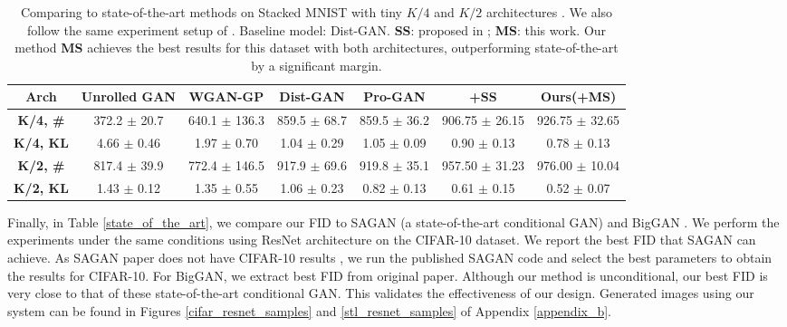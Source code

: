 \documentclass{article}
\begin{document}
\begin{table}
    \centering
    \scriptsize
    \caption{Comparing to state-of-the-art methods on Stacked MNIST with tiny $K/4$ and $K/2$ architectures \cite{metz-arxiv-2016}. We also follow the same experiment setup of \cite{metz-arxiv-2016}. Baseline model: Dist-GAN. {\bf SS}: proposed in \cite{chen-arxiv-2018}; {\bf MS}: this work. Our method {\bf MS} achieves the best results for this dataset with both architectures, outperforming state-of-the-art \cite{tran-eccv-2018,karras-iclr-2018} by a significant margin.}
    \begin{tabular}{ c  c  c  c  c  c  c }
    \toprule
    \textbf{Arch} & \textbf{Unrolled GAN \cite{metz-arxiv-2016}} & \textbf{WGAN-GP \cite{gulrajani-arxiv-2017}} & \textbf{Dist-GAN \cite{tran-eccv-2018}} & \textbf{Pro-GAN \cite{karras-iclr-2018}} & \textbf{\cite{tran-eccv-2018}+SS} & \textbf{Ours(\cite{tran-eccv-2018}+MS)}\\ 
    \hline
    \textbf{K/4, \#} & 372.2 $\pm$ 20.7 & 640.1 $\pm$ 136.3 & 859.5 $\pm$ 68.7 & 859.5 $\pm$ 36.2 & 906.75 $\pm$ 26.15 & 926.75 $\pm$ 32.65 \\ 
    \textbf{K/4, KL} & 4.66 $\pm$ 0.46 & 1.97 $\pm$ 0.70 & 1.04 $\pm$ 0.29 & 1.05 $\pm$ 0.09 & 0.90 $\pm$ 0.13 & 0.78 $\pm$ 0.13\\
    \hline
    \textbf{K/2, \#} & 817.4 $\pm$ 39.9 & 772.4 $\pm$ 146.5 & 917.9 $\pm$ 69.6 & 919.8 $\pm$ 35.1 & 957.50 $\pm$ 31.23 & 976.00 $\pm$ 10.04\\ 
    \textbf{K/2, KL} & 1.43 $\pm$ 0.12 & 1.35 $\pm$ 0.55  & 1.06 $\pm$ 0.23 & 0.82 $\pm$ 0.13 & 0.61 $\pm$ 0.15 & 0.52 $\pm$ 0.07\\
    \bottomrule
    \end{tabular}
    \label{new_experiments_stacked_mnist}
    \vspace{-0.4cm}
\end{table}

Finally, in Table \ref{state_of_the_art}, we compare our FID to SAGAN \cite{zhang-arxiv-2018} (a state-of-the-art conditional GAN) and BigGAN \cite{brock-iclr-2018}. We perform the experiments under the same conditions using ResNet architecture on the  CIFAR-10 dataset. We report the best FID that SAGAN can achieve. As SAGAN paper does not have CIFAR-10 results \cite{zhang-arxiv-2018}, we run the published SAGAN code and select the best parameters to obtain the results for CIFAR-10. For BigGAN, we extract best FID from original paper. Although our method is unconditional, our best FID is very close  to that of these state-of-the-art conditional GAN. This validates the effectiveness of our design. 
Generated images using our system can be found in 
Figures \ref{cifar_resnet_samples} and \ref{stl_resnet_samples} of Appendix \ref{appendix_b}.
\end{document}
